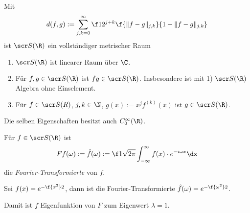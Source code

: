 \begin{nt} \label{4.3}
	Mit
	\[
		d(f,g) := \sum_{j,k = 0}^\infty \f 1{2^{j+k}} \f {\|f-g\|_{j,k}}{1+ \|f-g\|_{j,k}}
	\]
	ist $\scr S(\R)$ ein vollständiger metrischer Raum
\end{nt}

\begin{nt}[Eigenschaften] \label{4.4}
	\begin{enumerate}[1)]
		\item
			$\scr S(\R)$ ist linearer Raum über $\C$.
		\item
			Für $f,g \in \scr S (\R)$ ist $fg \in \scr S(\R)$.
			Insbesondere ist mit 1) $\scr S(\R)$ Algebra ohne Einselement.
		\item
			Für $f \in \scr S(R)$, $j,k \in \N$, $g(x) := x^j f^{(k)}(x)$ ist $g \in \scr S(\R)$.
	\end{enumerate}
	Die selben Eigenschaften besitzt auch $C_0^\infty(\R)$.
\end{nt}

\begin{df} \label{4.5}
	Für $f \in \scr S (\R)$ ist
	\[
		Ff(\omega) := \hat f(\omega) := \f 1{\sqrt{2\pi}} \int_{-\infty}^\infty f(x) \cdot e^{-i\omega x} \dx
	\]
	die \emph{Fourier-Transformierte} von $f$.
\end{df}

\begin{ex} \label{4.6}
	Sei $f(x) = e^{-\f {x^2}2}$, dann ist die Fourier-Transformierte $\hat f(\omega) = e^{-\f {\omega^2}2}$.

	Damit ist $f$ Eigenfunktion von $F$ zum Eigenwert $\lambda = 1$.
\end{ex}

